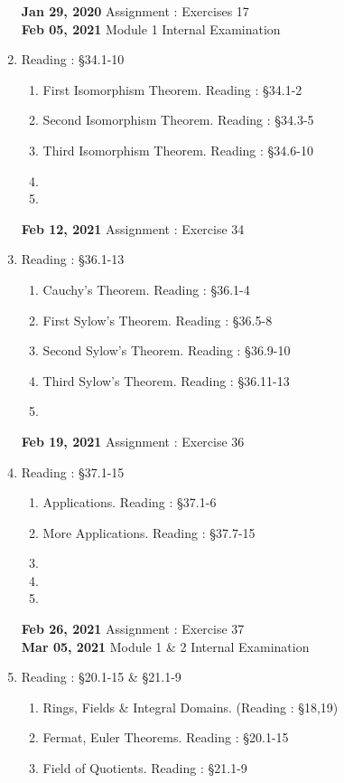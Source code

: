 \begin{enumerate}[label=Week \arabic*]
		\textbf{Jan 29, 2020} Assignment : Exercises 17\\
		\textbf{Feb 05, 2021} Module 1 Internal Examination
	\item Reading : \S34.1-10 
		\begin{enumerate}[label=Day \arabic*]
			\item First Isomorphism Theorem. Reading : \S34.1-2
			\item Second Isomorphism Theorem. Reading : \S34.3-5
			\item Third Isomorphism Theorem. Reading : \S34.6-10
			\item
			\item
		\end{enumerate}
		\textbf{Feb 12, 2021} Assignment : Exercise 34
	\item Reading : \S36.1-13
		\begin{enumerate}[label=Day \arabic*]
			\item Cauchy's Theorem. Reading : \S36.1-4
			\item First Sylow's Theorem. Reading : \S36.5-8
			\item Second Sylow's Theorem. Reading : \S36.9-10
			\item Third Sylow's Theorem. Reading : \S36.11-13
			\item
		\end{enumerate}
		\textbf{Feb 19, 2021} Assignment : Exercise 36
	\item Reading : \S37.1-15 
		\begin{enumerate}[label=Day \arabic*]
			\item Applications. Reading : \S37.1-6
			\item More Applications. Reading : \S37.7-15
			\item
			\item
			\item
		\end{enumerate}
		\textbf{Feb 26, 2021} Assignment : Exercise 37\\
		\textbf{Mar 05, 2021} Module 1 \& 2 Internal Examination
	\item Reading : \S20.1-15 \& \S21.1-9 
		\begin{enumerate}[label=Day \arabic*]
			\item Rings, Fields \& Integral Domains. (Reading : \S18,19)
			\item Fermat, Euler Theorems. Reading : \S20.1-15
			\item Field of Quotients. Reading : \S21.1-9

\end{enumerate}
\end{enumerate}
